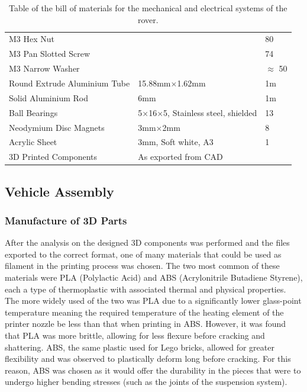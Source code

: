 \begin{table}[H]
\begin{tabular}{@{}lll@{}}
    M3 Hex Nut                         &                                                 & 80            \\
    M3 Pan Slotted Screw               &                                                 & 74            \\
    M3 Narrow Washer                   &                                                 & $\approx$ 50  \\
    Round Extrude Aluminium Tube       & 15.88mm$\times$1.62mm                           & 1m            \\
    Solid Aluminium Rod                & 6mm                                             & 1m            \\
    Ball Bearings                      & 5$\times$16$\times$5, Stainless steel, shielded & 13            \\
    Neodymium Disc Magnets             & 3mm$\times$2mm                                  & 8             \\
    Acrylic Sheet                      & 3mm, Soft white, A3                             & 1             \\
    3D Printed Components              & As exported from CAD                            &               \\ \bottomrule
    \end{tabular}
    \caption{Table of the bill of materials for the mechanical and electrical systems of the rover.}
    \label{tab:BOM}
    \end{table}
  
  \subsection{Vehicle Assembly}
    \subsubsection{Manufacture of 3D Parts}
    \label{subsubsec-vehicleBuild-3dPrinting}
      After the analysis on the designed 3D components was performed and the files exported to the correct format, one of many materials that could be used as filament in the printing process was chosen. The two most common of these materials were PLA (Polylactic Acid) and ABS (Acrylonitrile Butadiene Styrene), each a type of thermoplastic with associated thermal and physical properties. The more widely used of the two was PLA due to a significantly lower glass-point temperature meaning the required temperature of the heating element of the printer nozzle be less than that when printing in ABS. However, it was found that PLA was more brittle, allowing for less flexure before cracking and shattering. ABS, the same plastic used for Lego bricks, allowed for greater flexibility and was observed to plastically deform long before cracking. For this reason, ABS was chosen as it would offer the durability in the pieces that were to undergo higher bending stresses (such as the joints of the suspension system).
      
